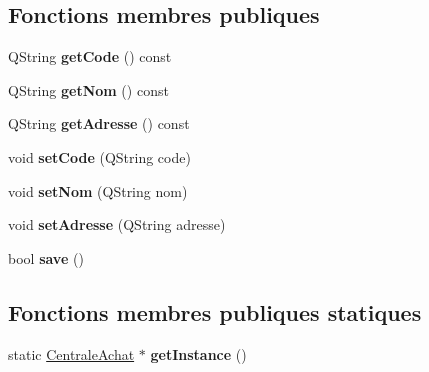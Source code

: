 \subsection*{Fonctions membres publiques}
\begin{DoxyCompactItemize}
\item 
\hypertarget{class_core_1_1_centrale_achat_a284b044048a7bd67ad63029ec60fcdcc}{
QString {\bfseries getCode} () const }
\label{da/d4d/class_core_1_1_centrale_achat_a284b044048a7bd67ad63029ec60fcdcc}

\item 
\hypertarget{class_core_1_1_centrale_achat_a899f3f4e45dc3208d2116b600a5b58cd}{
QString {\bfseries getNom} () const }
\label{da/d4d/class_core_1_1_centrale_achat_a899f3f4e45dc3208d2116b600a5b58cd}

\item 
\hypertarget{class_core_1_1_centrale_achat_aa796609a851120d03b7e469b9b380f3b}{
QString {\bfseries getAdresse} () const }
\label{da/d4d/class_core_1_1_centrale_achat_aa796609a851120d03b7e469b9b380f3b}

\item 
\hypertarget{class_core_1_1_centrale_achat_aea0f8c24a1c8438cd86b8ea665e2e812}{
void {\bfseries setCode} (QString code)}
\label{da/d4d/class_core_1_1_centrale_achat_aea0f8c24a1c8438cd86b8ea665e2e812}

\item 
\hypertarget{class_core_1_1_centrale_achat_a6f3a2d24f3669d7d5accb8f14a5ece2d}{
void {\bfseries setNom} (QString nom)}
\label{da/d4d/class_core_1_1_centrale_achat_a6f3a2d24f3669d7d5accb8f14a5ece2d}

\item 
\hypertarget{class_core_1_1_centrale_achat_a6affd660ba7fd08e4decc45aaafde5d1}{
void {\bfseries setAdresse} (QString adresse)}
\label{da/d4d/class_core_1_1_centrale_achat_a6affd660ba7fd08e4decc45aaafde5d1}

\item 
\hypertarget{class_core_1_1_centrale_achat_aa48c7e26bc294f8c0255e39ab40860ea}{
bool {\bfseries save} ()}
\label{da/d4d/class_core_1_1_centrale_achat_aa48c7e26bc294f8c0255e39ab40860ea}

\end{DoxyCompactItemize}
\subsection*{Fonctions membres publiques statiques}
\begin{DoxyCompactItemize}
\item 
\hypertarget{class_core_1_1_centrale_achat_a847763b5f69932f81a29335e32028a6b}{
static \hyperlink{class_core_1_1_centrale_achat}{CentraleAchat} $\ast$ {\bfseries getInstance} ()}
\label{da/d4d/class_core_1_1_centrale_achat_a847763b5f69932f81a29335e32028a6b}

\end{DoxyCompactItemize}


